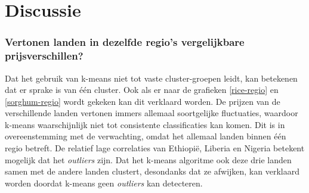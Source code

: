 \documentclass{article}
\begin{document}
\newpage
\section*{Discussie}

\subsubsection*{Vertonen landen in dezelfde regio’s vergelijkbare prijsverschillen?}
Dat het gebruik van k-means niet tot vaste cluster-groepen leidt, kan betekenen dat er sprake is van één cluster.
Ook als er naar de grafieken \ref{rice-regio} en \ref{sorghum-regio} wordt gekeken kan dit verklaard worden. De prijzen van de verschillende landen vertonen immers allemaal soortgelijke fluctuaties, waardoor k-means waarschijnlijk niet tot consistente classificaties kan komen.
Dit is in overeenstemming met de verwachting, omdat het allemaal landen binnen één regio betreft.
De relatief lage correlaties van Ethiopië, Liberia en Nigeria betekent mogelijk dat het \textit{outliers} zijn. Dat het k-means algoritme ook deze drie landen samen met de andere landen clustert, desondanks dat ze afwijken, kan verklaard worden doordat k-means geen \textit{outliers} kan detecteren.

 
\end{document}
